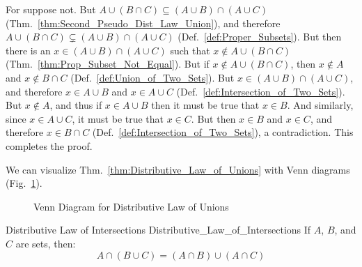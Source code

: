         \begin{bproof}
            For suppose not. But
            $A\cup(B\cap{C})\subseteq(A\cup{B})\cap(A\cup{C})$
            (Thm.~\ref{thm:Second_Pseudo_Dist_Law_Union}), and therefore
            $A\cup(B\cap{C})\subsetneq(A\cup{B})\cap(A\cup{C})$
            (Def.~\ref{def:Proper_Subsets}). But then there is an
            $x\in(A\cup{B})\cap(A\cup{C})$ such that $x\notin{A}\cup(B\cap{C})$
            (Thm.~\ref{thm:Prop_Subset_Not_Equal}). But if
            $x\notin{A}\cup(B\cap{C})$, then $x\notin{A}$ and
            $x\notin{B}\cap{C}$ (Def.~\ref{def:Union_of_Two_Sets}). But
            $x\in(A\cup{B})\cap(A\cup{C})$, and therefore $x\in{A}\cup{B}$ and
            $x\in{A}\cup{C}$ (Def.~\ref{def:Intersection_of_Two_Sets}). But
            $x\notin{A}$, and thus if $x\in{A}\cup{B}$ then it must be true
            that $x\in{B}$. And similarly, since $x\in{A}\cup{C}$, it must be
            true that $x\in{C}$. But then $x\in{B}$ and $x\in{C}$, and therefore
            $x\in{B}\cap{C}$ (Def.~\ref{def:Intersection_of_Two_Sets}), a
            contradiction. This completes the proof.
        \end{bproof}
        We can visualize Thm.~\ref{thm:Distributive_Law_of_Unions} with Venn
        diagrams
        (Fig.~\ref{fig:Venn_Diagram_Distributive_Law_of_Unions}).
        \begin{figure}[H]
            \centering
            \captionsetup{type=figure}
            
            \caption{Venn Diagram for Distributive Law of Unions}
            \label{fig:Venn_Diagram_Distributive_Law_of_Unions}
        \end{figure}
        \begin{ftheorem}{Distributive Law of Intersections}
                        {Distributive_Law_of_Intersections}
            If $A$, $B$, and $C$ are sets, then:
            \begin{equation*}
                A\cap(B\cup{C})=(A\cap{B})\cup(A\cap{C})
            \end{equation*}
        \end{ftheorem}
